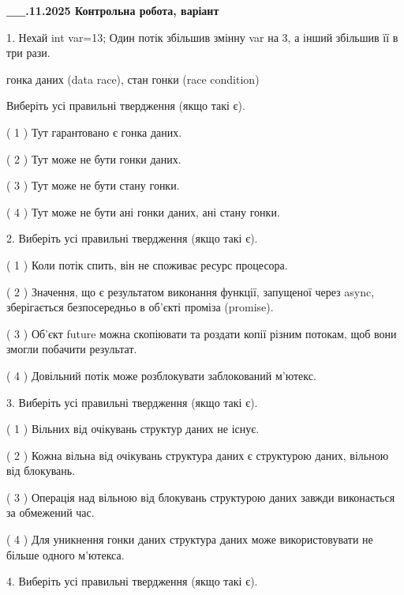 \documentclass[12pt, ukrainian]{article}
\begin{document}
\newpage
\begin {large}

\textbf{\_\_.11.2025 Контрольна робота, варіант  }\par


{
1. Нехай int var=13; Один потік збільшив змінну var на 3, а інший збільшив її в три рази.

гонка даних (data race), стан гонки (race condition)

Виберіть усі правильні твердження (якщо такі є).\par
\vspace{2mm}
( 1 ) Тут гарантовано є гонка даних.%

( 2 ) Тут може не бути гонки даних.%

( 3 ) Тут може не бути стану гонки.%

( 4 ) Тут може не бути ані гонки даних, ані стану гонки.%


2. Виберіть усі правильні твердження (якщо такі є).\par
\vspace{2mm}

( 1 ) Коли потік спить, він не споживає ресурс процесора.%

( 2 ) Значення, що є результатом виконання функції, запущеної через async, зберігається безпосередньо в об’єкті проміза (promise).%

( 3 ) Об’єкт future можна скопіювати та роздати копії різним потокам, щоб вони змогли побачити результат.%

( 4 ) Довільний потік може розблокувати заблокований м’ютекс.%


3. Виберіть усі правильні твердження (якщо такі є).\par
\vspace{2mm}

( 1 ) Вільних від очікувань структур даних не існує.%

( 2 ) Кожна вільна від очікувань структура даних є структурою даних, вільною від блокувань.%

( 3 ) Операція над вільною від блокувань структурою даних завжди виконається за обмежений час.%

( 4 ) Для уникнення гонки даних структура даних може використовувати не більше одного м’ютекса.%


4. Виберіть усі правильні твердження (якщо такі є).\par
\vspace{2mm}

}
\end{large}
\end{document}
